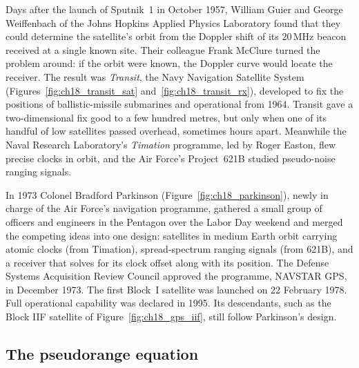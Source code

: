 \begin{history}
Days after the launch of Sputnik~1 in October 1957, William Guier and George Weiffenbach of
the Johns Hopkins Applied Physics Laboratory found that they could determine the satellite's
orbit from the Doppler shift of its 20\,MHz beacon received at a single known site. Their
colleague Frank McClure turned the problem around: if the orbit were known, the Doppler
curve would locate the receiver. The result was \emph{Transit}, the Navy Navigation Satellite
System (Figures~\ref{fig:ch18_transit_sat} and~\ref{fig:ch18_transit_rx}), developed to fix the positions of ballistic-missile
submarines and operational from 1964. Transit gave a two-dimensional fix good to a few hundred
metres, but only when one of its handful of low satellites passed overhead, sometimes hours apart.
Meanwhile the Naval Research Laboratory's \emph{Timation} programme, led by Roger Easton, flew
precise clocks in orbit, and the Air Force's Project~621B studied pseudo-noise ranging signals.

In 1973 Colonel Bradford Parkinson (Figure~\ref{fig:ch18_parkinson}), newly in charge of the Air
Force's navigation programme, gathered a small group of officers and engineers in the Pentagon over
the Labor Day weekend and merged the competing ideas into one design: satellites in medium Earth
orbit carrying atomic clocks (from Timation), spread-spectrum ranging signals (from 621B), and a
receiver that solves for its clock offset along with its position. The Defense Systems
Acquisition Review Council approved the programme, NAVSTAR GPS, in December 1973. The first
Block~I satellite was launched on 22 February 1978. Full operational capability was declared
in 1995. Its descendants, such as the Block IIF satellite of Figure~\ref{fig:ch18_gps_iif}, still
follow Parkinson's design.
\end{history}


\subsection{The pseudorange equation}

